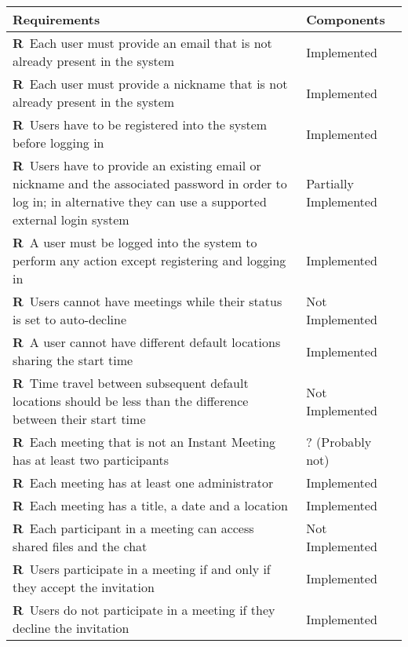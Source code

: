 \newcommand{\reqNum}{\stepcounter{countReq}\thecountReq}

\def\arraystretch{1.5}
\begin{longtable}{|m{7cm}|m{7cm}|}
	\hline
	\textbf{Requirements}            & 		\textbf{Components}		    \\ \hline
	\textbf{R\reqNum}~Each user must provide an email that is not already present in the system & Implemented	\\ \hline
	\textbf{R\reqNum}~Each user must provide a nickname that is not already present in the system & Implemented	\\ \hline
	\textbf{R\reqNum}~Users have to be registered into the system before logging in & Implemented	\\ \hline
	\textbf{R\reqNum}~Users have to provide an existing email or nickname and the associated password in order to log in; in alternative they can use a supported external login system & Partially Implemented	\\ \hline
	\textbf{R\reqNum}~A user must be logged into the system to perform any action except registering and logging in & Implemented	\\ \hline
	\textbf{R\reqNum}~Users cannot have meetings while their status is set to auto-decline & Not Implemented	\\ \hline
	\textbf{R\reqNum}~A user cannot have different default locations sharing the start time & Implemented	\\ \hline
	\textbf{R\reqNum}~Time travel between subsequent default locations should be less than the difference between their start time & Not Implemented	\\ \hline
	\textbf{R\reqNum}~Each meeting that is not an Instant Meeting has at least two participants & ? (Probably not)	\\ \hline
	\textbf{R\reqNum}~Each meeting has at least one administrator & Implemented	\\ \hline
	\textbf{R\reqNum}~Each meeting has a title, a date and a location & Implemented	\\ \hline
	\textbf{R\reqNum}~Each participant in a meeting can access shared files and the chat & Not Implemented \\ \hline
	\textbf{R\reqNum}~Users participate in a meeting if and only if they accept the invitation & Implemented	\\ \hline
	\textbf{R\reqNum}~Users do not participate in a meeting if they decline the invitation & Implemented	\\ \hline

\end{longtable}
